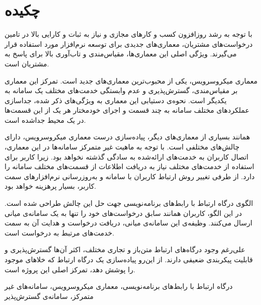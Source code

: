 \section*{چکیده}
با توجه به رشد روز‌افزون کسب و کارهای مجازی و نیاز به ثبات و کارایی بالا در تامین درخواست‌‌های مشتریان، معماری‌های جدیدی برای توسعه نرم‌افزار مورد استفاده قرار می‌گیرند. ویژگی اصلی این معماری‌ها، مقیاس‌مندی و تاب‌آوری بالا برای پاسخ به مشتریان است.

معماری میکروسرویس، یکی از محبوب‌ترین معماری‌های جدید است. تمرکز این معماری بر مقیاس‌مندی، گسترش‌پذیری و عدم وابستگی خدمت‌های مختلف یک سامانه به یکدیگر است. نحوه‌ی دستیابی این معماری به ویژگی‌های ذکر شده، جداسازی عملکرد‌های مختلف سامانه به چند قسمت و اجرای خودمختار هر یک از این قسمت‌ها در یک محیط جدا‌شده
است.

همانند بسیاری از معماری‌های دیگر، پیاده‌سازی درست معماری میکروسرویس، دارای چالش‌های مختلفی است. با توجه به ماهیت غیر متمرکز سامانه‌ها در این معماری، اتصال کاربران به خدمت‌های ارائه‌شده به سادگی گذشته نخواهد بود. زیرا کاربر برای استفاده از خدمت‌های مختلف نیاز به دریافت اطلاعات از قسمت‌های مختلف سامانه را دارد. از طرفی تغییر روش ارتباط کاربران با سامانه و به‌روزرسانی نرم‌افزارهای سمت کاربر، بسیار پرهزینه خواهد بود.

الگوی درگاه ارتباط با رابط‌های برنامه‌نویسی جهت حل این چالش طراحی شده است. در این الگو، کاربران همانند سابق درخواست‌های خود را تنها به یک سامانه‌ی میانی ارسال می‌کنند. وظیفه‌ی این سامانه‌ی میانی، دریافت درخواست و هدایت ‌آن به سمت خدمت‌های مرتبط به درخواست است.

علی‌رغم وجود درگاه‌های ارتباط متن‌باز و تجاری مختلف، اکثر آن‌ها گسترش‌پذیری و قابلیت پیکربندی ضعیفی دارند. از این‌رو پیاده‌سازی یک درگاه ارتباط که خلاهای موجود را پوشش دهد، تمرکز اصلی این پروژه است.

درگاه ارتباط با رابط‌های برنامه‌نویسی، معماری میکروسرویس، سامانه‌های غیر متمرکز، سامانه‌ی گسترش‌پذیر
\cleardoublepage 